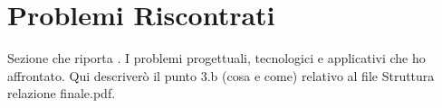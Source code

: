 \section{Problemi Riscontrati}

Sezione che riporta . I problemi progettuali, tecnologici e applicativi che ho affrontato.
Qui descriverò il punto 3.b (cosa e come) relativo al file Struttura relazione finale.pdf.



